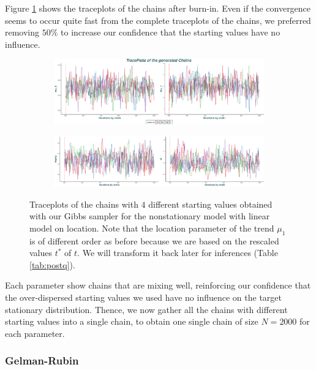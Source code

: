  Figure \ref{fig:mixchains} shows the traceplots of the chains after burn-in. Even if the convergence seems to occur quite fast from the complete traceplots of the chains, we preferred removing $50\%$ to increase our confidence that the starting values have no influence.
\begin{figure}
	\centering
	\begin{subfigure}[b]{0.99\textwidth}
		\includegraphics[width=1\linewidth]{chains1.pdf}
	\end{subfigure}
	
	\begin{subfigure}[b]{0.99\textwidth}
		\includegraphics[width=1\linewidth]{chains2.pdf}
	\end{subfigure}
	\caption{Traceplots of the chains with $4$ different starting values obtained with our Gibbs sampler for the nonstationary model with linear model on location. Note that the location parameter of the trend $\mu_1$ is of different order as before because we are based on the rescaled values $t^*$ of $t$. We will transform it back  later for inferences (Table \ref{tab:postq}). }\label{fig:mixchains}
\end{figure}
Each parameter show chains that are mixing well, reinforcing our confidence that the over-dispersed starting values we used have no influence on the target stationary distribution. 
Thence, we now gather all the chains with different starting values into a single chain, to obtain one single chain of size $N=2000$ for each parameter.


\subsubsection*{Gelman-Rubin}

